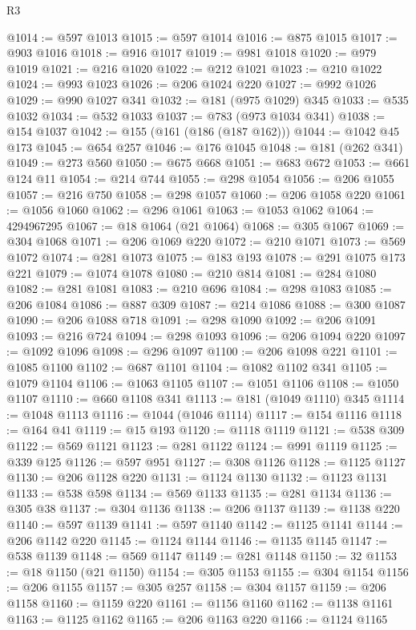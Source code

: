 \begin{lexlean}{R3}
\begin{coremodule}
@1014 := @597 @1013
@1015 := @597 @1014
@1016 := @875 @1015
@1017 := @903 @1016
@1018 := @916 @1017
@1019 := @981 @1018
@1020 := @979 @1019
@1021 := @216 @1020
@1022 := @212 @1021
@1023 := @210 @1022
@1024 := @993 @1023
@1026 := @206 @1024 @220
@1027 := @992 @1026
@1029 := @990 @1027 @341
@1032 := @181 (@975 @1029) @345
@1033 := @535 @1032
@1034 := @532 @1033
@1037 := @783 (@973 @1034 @341)
@1038 := @154 @1037
@1042 := @155 (@161 (@186 (@187 @162)))
@1044 := @1042 @45 @173
@1045 := @654 @257
@1046 := @176 @1045
@1048 := @181 (@262 @341)
@1049 := @273 @560
@1050 := @675 @668
@1051 := @683 @672
@1053 := @661 @124 @11
@1054 := @214 @744
@1055 := @298 @1054
@1056 := @206 @1055
@1057 := @216 @750
@1058 := @298 @1057
@1060 := @206 @1058 @220
@1061 := @1056 @1060
@1062 := @296 @1061
@1063 := @1053 @1062
@1064 := 4294967295
@1067 := @18 @1064 (@21 @1064)
@1068 := @305 @1067
@1069 := @304 @1068
@1071 := @206 @1069 @220
@1072 := @210 @1071
@1073 := @569 @1072
@1074 := @281 @1073
@1075 := @183 @193
@1078 := @291 @1075 @173 @221
@1079 := @1074 @1078
@1080 := @210 @814
@1081 := @284 @1080
@1082 := @281 @1081
@1083 := @210 @696
@1084 := @298 @1083
@1085 := @206 @1084
@1086 := @887 @309
@1087 := @214 @1086
@1088 := @300 @1087
@1090 := @206 @1088 @718
@1091 := @298 @1090
@1092 := @206 @1091
@1093 := @216 @724
@1094 := @298 @1093
@1096 := @206 @1094 @220
@1097 := @1092 @1096
@1098 := @296 @1097
@1100 := @206 @1098 @221
@1101 := @1085 @1100
@1102 := @687 @1101
@1104 := @1082 @1102 @341
@1105 := @1079 @1104
@1106 := @1063 @1105
@1107 := @1051 @1106
@1108 := @1050 @1107
@1110 := @660 @1108 @341
@1113 := @181 (@1049 @1110) @345
@1114 := @1048 @1113
@1116 := @1044 (@1046 @1114)
@1117 := @154 @1116
@1118 := @164 @41
@1119 := @15 @193
@1120 := @1118 @1119
@1121 := @538 @309
@1122 := @569 @1121
@1123 := @281 @1122
@1124 := @991 @1119
@1125 := @339 @125
@1126 := @597 @951
@1127 := @308 @1126
@1128 := @1125 @1127
@1130 := @206 @1128 @220
@1131 := @1124 @1130
@1132 := @1123 @1131
@1133 := @538 @598
@1134 := @569 @1133
@1135 := @281 @1134
@1136 := @305 @38
@1137 := @304 @1136
@1138 := @206 @1137
@1139 := @1138 @220
@1140 := @597 @1139
@1141 := @597 @1140
@1142 := @1125 @1141
@1144 := @206 @1142 @220
@1145 := @1124 @1144
@1146 := @1135 @1145
@1147 := @538 @1139
@1148 := @569 @1147
@1149 := @281 @1148
@1150 := 32
@1153 := @18 @1150 (@21 @1150)
@1154 := @305 @1153
@1155 := @304 @1154
@1156 := @206 @1155
@1157 := @305 @257
@1158 := @304 @1157
@1159 := @206 @1158
@1160 := @1159 @220
@1161 := @1156 @1160
@1162 := @1138 @1161
@1163 := @1125 @1162
@1165 := @206 @1163 @220
@1166 := @1124 @1165

\end{coremodule}
\end{lexlean}
